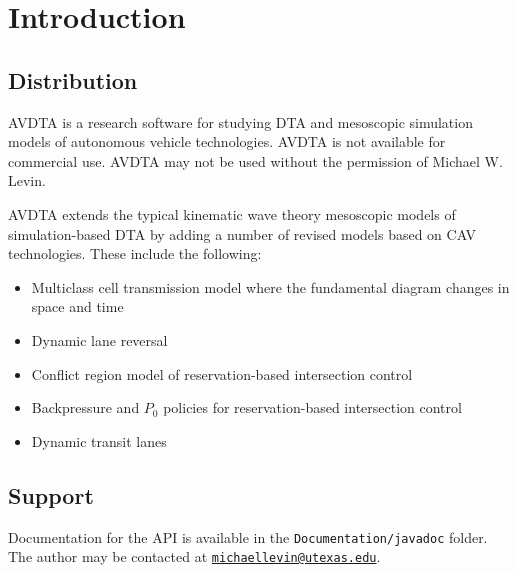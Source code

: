\chapter{Introduction}





\section{Distribution}
AVDTA is a research software for studying DTA and mesoscopic simulation models of autonomous vehicle technologies. AVDTA is not available for commercial use. AVDTA may not be used without the permission of Michael W. Levin.

AVDTA extends the typical kinematic wave theory mesoscopic models of simulation-based DTA by adding a number of revised models based on CAV technologies. These include the following:
\begin{itemize}
	\item Multiclass cell transmission model where the fundamental diagram changes in space and time\cite{levin2016multiclass}
	\item Dynamic lane reversal\cite{levin2016cell, duell2016system}
	\item Conflict region model of reservation-based intersection control\cite{levin2015intersection, levin2015optimizing}
	\item Backpressure and $P_0$ policies for reservation-based intersection control
	\item Dynamic transit lanes
\end{itemize}


\section{Support}
Documentation for the API is available in the \texttt{Documentation/javadoc} folder. The author may be contacted at \href{mailto:michaellevin@utexas.edu}{\texttt{michaellevin@utexas.edu}}.